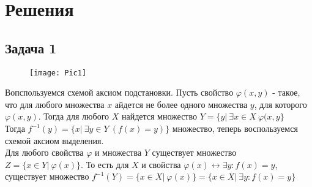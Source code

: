 
\newpage
\section*{Решения}
\subsection*{Задача 1}
	\begin{figure}[!h]
		\texttt{[image: Pic1]}
	\end{figure}
	Вопспользуемся схемой аксиом подстановки. Пусть свойство $\varphi(x,y)$ - такое, что для любого множества $x$ айдется не более одного множества $y$, для которого $\varphi(x,y)$. Тогда для любого $X$ найдется множество $Y = \{y|\ \exists x \in X\ \varphi(x,y\}$\\
	Тогда $f^{-1}(y) = \{x|\ \exists y \in Y\ (f(x) = y)\}$ множество, теперь воспользуемся схемой аксиом выделения.\\
	Для любого свойства $\varphi$ и множества $Y$ существует множество $Z = \{x \in Y|\ \varphi(x)\}$. То есть для $X$ и свойства $\varphi(x) \leftrightarrow \exists y: f(x) = y$, существует множество $f^{-1}(Y) = \{x \in X|\ \varphi(x)\} = \{x \in X|\ \exists y: f(x) = y\}$
	\begin{comment}
	Схема аксиом выделения: для любого свойства множеств $\varphi$ и множества $\tilde{Y}$ существует множество $L = \{x \in Y\ |\ \varphi(x)\}$.\\
	Для $f(x) = \{y\ |\ \exists x \in X\ (f(x) = y)\}$ у нас:\\
	Свойство $\varphi(y):\ \exists x \in X:\ f(x) = y$,\\
	Множество $\tilde{Y} = B$
	\vskip 0.1in
	Тогда существует множество $L = \{y \in B\ |\ \varphi(y)\}$. Так как $f(x) \subset B$, это и есть $f(x)$.\\
	Для $f^{-1}(y) = \{x\ |\ \exists y \in Y\ (f(x) = y)\}$ есть:\\
	Свойство $\varphi(x):\ \exists y \in Y:\ f(x) = y,$\\
	Множество $\tilde{Y} = A$
	\vskip 0.1in
	Тогда существует множество $L = \{x \in A\ |\ \varphi(x)\}$, так как $f^{-1}(y) \subset A$, это и есть $f^{-1}(y)$
	\end{comment}
\vskip 0.4in

